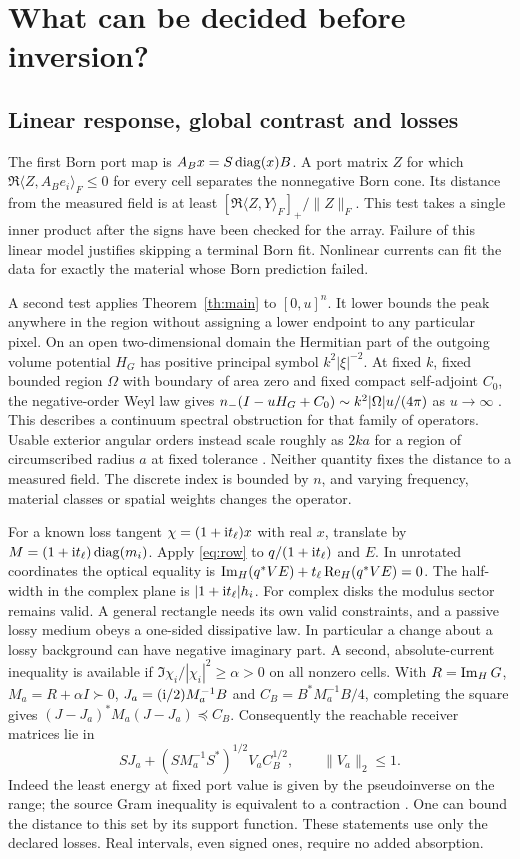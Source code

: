 \section{What can be decided before inversion?}\label{sec:use}
\subsection{Linear response, global contrast and losses}
The first Born port map is $A_B x=S\operatorname{diag}(x)B$. A port matrix $Z$ for which
$\Re\langle Z,A_B e_i\rangle_F\le0$ for every cell separates the nonnegative Born cone. Its distance from the measured field is at least $[\Re\langle Z,Y\rangle_F]_+/\|Z\|_F$. This test takes a single inner product after the signs have been checked for the array. Failure of this linear model justifies skipping a terminal Born fit. Nonlinear currents can fit the data for exactly the material whose Born prediction failed.

A second test applies Theorem~\ref{th:main} to $[0,u]^n$. It lower bounds the peak anywhere in the region without assigning a lower endpoint to any particular pixel. On an open two-dimensional domain the Hermitian part of the outgoing volume potential $H_G$ has positive principal symbol $k^2|\xi|^{-2}$. At fixed $k$, fixed bounded region $\Omega$ with boundary of area zero and fixed compact self-adjoint $C_0$, the negative-order Weyl law gives
$n_{-}(I-uH_G+C_0)\sim k^2|\Omega|u/(4\pi)$ as $u\to\infty$ \cite{ponge}. This describes a continuum spectral obstruction for that family of operators. Usable exterior angular orders instead scale roughly as $2ka$ for a region of circumscribed radius $a$ at fixed tolerance \cite{bucci87,bucci89}. Neither quantity fixes the distance to a measured field. The discrete index is bounded by $n$, and varying frequency, material classes or spatial weights changes the operator.

For a known loss tangent $\chi=(1+{\rm i}t_\ell)x$ with real $x$, translate by $M=(1+{\rm i}t_\ell)\operatorname{diag}(m_i)$. Apply \eqref{eq:row} to $q/(1+{\rm i}t_\ell)$ and $E$. In unrotated coordinates the optical equality is $\operatorname{Im}_{H}(q^*VE)+t_\ell\operatorname{Re}_{H}(q^*VE)=0$. The half-width in the complex plane is $|1+{\rm i}t_\ell|h_i$. For complex disks the modulus sector remains valid. A general rectangle needs its own valid constraints, and a passive lossy medium obeys a one-sided dissipative law. In particular a change about a lossy background can have negative imaginary part. A second, absolute-current inequality is available if $\Im\chi_i/|\chi_i|^2\ge\alpha>0$ on all nonzero cells. With $R=\operatorname{Im}_{H} G$, $M_a=R+\alpha I\succ0$, $J_a=({\rm i}/2)M_a^{-1}B$ and $C_B=B^*M_a^{-1}B/4$, completing the square gives $(J-J_a)^*M_a(J-J_a)\preceq C_B$. Consequently the reachable receiver matrices lie in
\begin{equation}
 SJ_a+(SM_a^{-1}S^*)^{1/2} V_a C_B^{1/2},\qquad \|V_a\|_2\le1 .
 \label{eq:lossy}
\end{equation}
Indeed the least energy at fixed port value is given by the pseudoinverse on the range; the source Gram inequality is equivalent to a contraction \cite{douglas}. One can bound the distance to this set by its support function. These statements use only the declared losses. Real intervals, even signed ones, require no added absorption.

